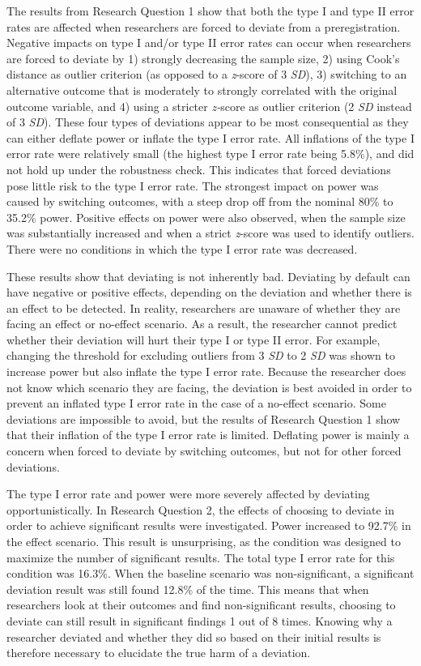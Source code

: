 \documentclass[
  man,
  floatsintext,
  longtable,
  nolmodern,
  notxfonts,
  notimes,
  colorlinks=true,linkcolor=blue,citecolor=blue,urlcolor=blue]{apa7}
\begin{document}
The results from Research Question 1 show that both the type I and type
II error rates are affected when researchers are forced to deviate from
a preregistration. Negative impacts on type I and/or type II error rates
can occur when researchers are forced to deviate by 1) strongly
decreasing the sample size, 2) using Cook's distance as outlier
criterion (as opposed to a \emph{z}-score of 3 \emph{SD}), 3) switching
to an alternative outcome that is moderately to strongly correlated with
the original outcome variable, and 4) using a stricter \emph{z-}score as
outlier criterion (2 \emph{SD} instead of 3 \emph{SD}). These four types
of deviations appear to be most consequential as they can either deflate
power or inflate the type I error rate. All inflations of the type I
error rate were relatively small (the highest type I error rate being
5.8\%), and did not hold up under the robustness check. This indicates
that forced deviations pose little risk to the type I error rate. The
strongest impact on power was caused by switching outcomes, with a steep
drop off from the nominal 80\% to 35.2\% power. Positive effects on
power were also observed, when the sample size was substantially
increased and when a strict \emph{z}-score was used to identify
outliers. There were no conditions in which the type I error rate was
decreased.

These results show that deviating is not inherently bad. Deviating by
default can have negative or positive effects, depending on the
deviation and whether there is an effect to be detected. In reality,
researchers are unaware of whether they are facing an effect or
no-effect scenario. As a result, the researcher cannot predict whether
their deviation will hurt their type I or type II error. For example,
changing the threshold for excluding outliers from 3 \emph{SD} to 2
\emph{SD} was shown to increase power but also inflate the type I error
rate. Because the researcher does not know which scenario they are
facing, the deviation is best avoided in order to prevent an inflated
type I error rate in the case of a no-effect scenario. Some deviations
are impossible to avoid, but the results of Research Question 1 show
that their inflation of the type I error rate is limited. Deflating
power is mainly a concern when forced to deviate by switching outcomes,
but not for other forced deviations.

The type I error rate and power were more severely affected by deviating
opportunistically. In Research Question 2, the effects of choosing to
deviate in order to achieve significant results were investigated. Power
increased to 92.7\% in the effect scenario. This result is unsurprising,
as the condition was designed to maximize the number of significant
results. The total type I error rate for this condition was 16.3\%. When
the baseline scenario was non-significant, a significant deviation
result was still found 12.8\% of the time. This means that when
researchers look at their outcomes and find non-significant results,
choosing to deviate can still result in significant findings 1 out of 8
times. Knowing why a researcher deviated and whether they did so based
on their initial results is therefore necessary to elucidate the true
harm of a deviation.
\end{document}
